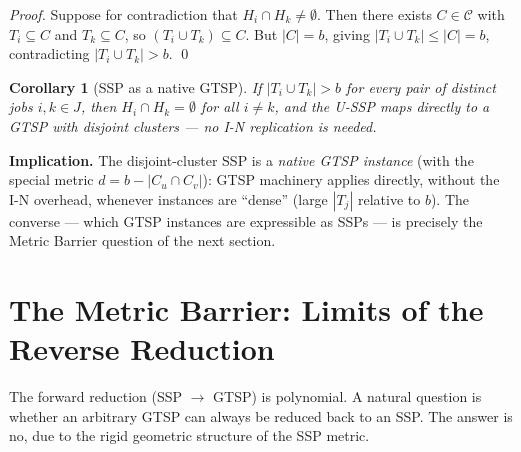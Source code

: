 \documentclass[11pt,a4paper]{article}
\theoremstyle{plain}
\newtheorem{corollary}[theorem]{Corollary}
\theoremstyle{definition}
\begin{document}
\begin{proofbox}
\begin{proof}
Suppose for contradiction that $H_i \cap H_k \ne \emptyset$. Then there exists
$C \in \mathcal{C}$ with $T_i \subseteq C$ and $T_k \subseteq C$, so
$(T_i \cup T_k) \subseteq C$. But $|C| = b$, giving
$|T_i \cup T_k| \le |C| = b$, contradicting $|T_i \cup T_k| > b$. \qed
\end{proof}
\end{proofbox}

\begin{corollary}[SSP as a native GTSP]
If $|T_i \cup T_k| > b$ for \emph{every} pair of distinct jobs $i,k \in J$,
then $H_i \cap H_k = \emptyset$ for all $i \ne k$, and the U-SSP maps directly
to a GTSP with disjoint clusters — no I-N replication is needed.
\end{corollary}

\noindent\textbf{Implication.}
The disjoint-cluster SSP is a \emph{native GTSP instance} (with the special metric
$d=b-|C_u\cap C_v|$): GTSP machinery applies directly, without the I-N overhead,
whenever instances are ``dense'' (large $|T_j|$ relative to $b$). The converse ---
which GTSP instances are expressible as SSPs --- is precisely the Metric Barrier
question of the next section.

\section{The Metric Barrier: Limits of the Reverse Reduction}
\label{sec:metric_barrier}

The forward reduction (SSP $\to$ GTSP) is polynomial. A natural question is whether
an arbitrary GTSP can always be reduced back to an SSP. The answer is no, due to
the rigid geometric structure of the SSP metric.
\end{document}
